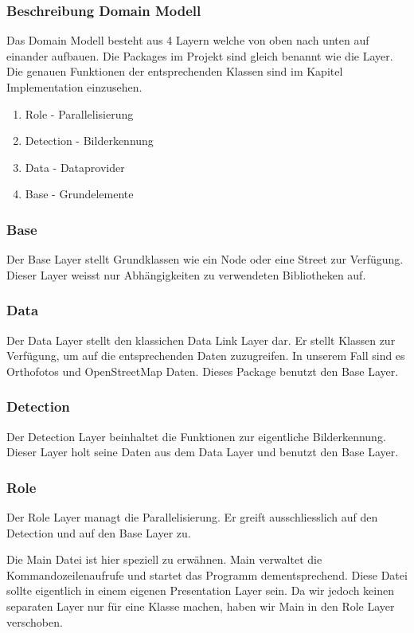 \subsubsection{Beschreibung Domain Modell}
Das Domain Modell besteht aus 4 Layern welche von oben nach unten auf einander aufbauen. Die Packages im Projekt sind gleich benannt wie die Layer. Die genauen Funktionen der entsprechenden Klassen sind im Kapitel Implementation einzusehen.
\begin{enumerate}
	\item Role - Parallelisierung
	\item Detection - Bilderkennung
	\item Data - Dataprovider
	\item Base - Grundelemente
\end{enumerate}

\subsubsection{Base}
Der Base Layer stellt Grundklassen wie ein Node oder eine Street zur Verfügung. Dieser Layer weisst nur Abhängigkeiten zu verwendeten Bibliotheken auf.

\subsubsection{Data}
Der Data Layer stellt den klassichen Data Link Layer dar. Er stellt Klassen zur Verfügung, um auf die entsprechenden Daten zuzugreifen. In unserem Fall sind es Orthofotos und OpenStreetMap Daten. Dieses Package benutzt den Base Layer.

\subsubsection{Detection}
Der Detection Layer beinhaltet die Funktionen zur eigentliche Bilderkennung. Dieser Layer holt seine Daten aus dem Data Layer und benutzt den Base Layer.

\subsubsection{Role}
Der Role Layer managt die Parallelisierung. Er greift ausschliesslich auf den Detection und auf den Base Layer zu.

Die Main Datei ist hier speziell zu erwähnen. Main verwaltet die Kommandozeilenaufrufe und startet das Programm dementsprechend. Diese Datei sollte eigentlich in einem eigenen Presentation Layer sein. Da wir jedoch keinen separaten Layer nur für eine Klasse machen, haben wir Main in den Role Layer verschoben.
